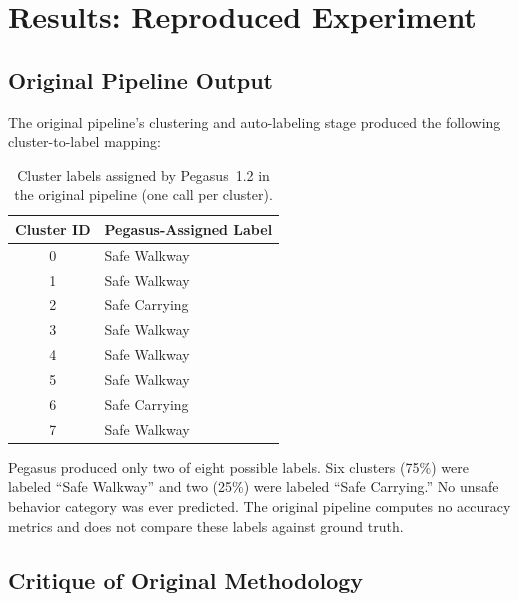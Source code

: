 \documentclass[11pt,a4paper]{article}
\begin{document}
\section{Results: Reproduced Experiment}

\subsection{Original Pipeline Output}

The original pipeline's clustering and auto-labeling stage produced the following cluster-to-label mapping:

\begin{table}[H]
\centering
\caption{Cluster labels assigned by Pegasus~1.2 in the original pipeline (one call per cluster).}
\label{tab:original_clusters}
\begin{tabular}{@{}cl@{}}
\toprule
\textbf{Cluster ID} & \textbf{Pegasus-Assigned Label} \\
\midrule
0 & Safe Walkway \\
1 & Safe Walkway \\
2 & Safe Carrying \\
3 & Safe Walkway \\
4 & Safe Walkway \\
5 & Safe Walkway \\
6 & Safe Carrying \\
7 & Safe Walkway \\
\bottomrule
\end{tabular}
\end{table}

Pegasus produced only two of eight possible labels. Six clusters (75\%) were labeled ``Safe Walkway'' and two (25\%) were labeled ``Safe Carrying.'' No unsafe behavior category was ever predicted. The original pipeline computes no accuracy metrics and does not compare these labels against ground truth.

\subsection{Critique of Original Methodology}
\end{document}
